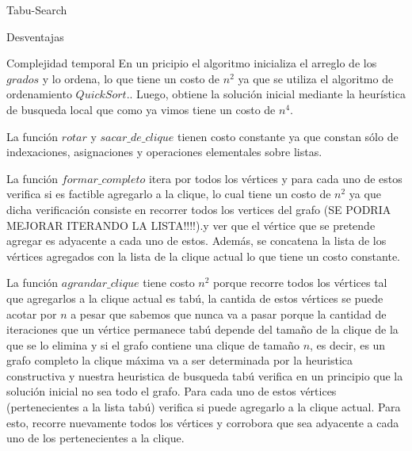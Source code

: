 \begin{section}{Tabu-Search}
	\begin{subsection}{Desventajas}
	
	\end{subsection}

	\begin{subsection}{Complejidad temporal}
			En un pricipio el algoritmo inicializa el arreglo de los $grados$ y lo ordena, lo que tiene un costo de $n^2$ ya que se utiliza el algoritmo de ordenamiento $QuickSort$.. Luego, obtiene la solución inicial mediante la heurística de busqueda local que como ya vimos tiene un costo de $n^4$.

			La función $rotar$ y $sacar\_de\_clique$ tienen costo constante ya que constan sólo de indexaciones, asignaciones y operaciones elementales sobre listas.

			La función $formar\_completo$ itera por todos los vértices y para cada uno de estos verifica si es factible agregarlo a la clique, lo cual tiene un costo de $n^2$ ya que dicha verificación consiste en recorrer todos los vertices del grafo (SE PODRIA MEJORAR ITERANDO LA LISTA!!!!).y ver que el vértice que se pretende agregar es adyacente a cada uno de estos. Además, se concatena la lista de los vértices agregados con la lista de la clique actual lo que tiene un costo constante.

			La función $agrandar\_clique$ tiene costo $n^2$ porque recorre todos los vértices tal que agregarlos a la clique actual es tabú, la cantida de estos vértices se puede acotar por $n$ a pesar que sabemos que nunca va a pasar porque la cantidad de iteraciones que un vértice permanece tabú depende del tamaño de la clique de la que se lo elimina y si el grafo contiene una clique de tamaño $n$, es decir, es un grafo completo la clique máxima va a ser determinada por la heuristica constructiva y nuestra heuristica de busqueda tabú verifica en un principio que la solución inicial no sea todo el grafo. Para cada uno de estos vértices (pertenecientes a la lista tabú) verifica si puede agregarlo a la clique actual. Para esto, recorre nuevamente todos los vértices y corrobora que sea adyacente a cada uno de los pertenecientes a la clique.


\end{subsection}
\end{section}
